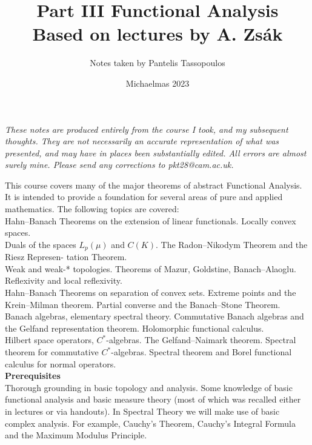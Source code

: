 \documentclass{article}
\title{\Huge Part III Functional Analysis \\ 
\huge Based on lectures by A. Zs\'{ak}}
\author{\Large Notes taken by Pantelis Tassopoulos}
\date{\Large Michaelmas 2023}
\begin{document}
\maketitle

\begin{center}
\textit{These notes are produced entirely from the course I took, and my subsequent thoughts. They are not necessarily an accurate representation of what was presented, and may have in places been substantially edited. All errors are almost surely mine. Please send any corrections to pkt28@cam.ac.uk.}

\end{center}

\noindent This course covers many of the major theorems of abstract Functional Analysis. It is intended to provide a foundation for several areas of pure and applied mathematics. The following topics are covered:\\

\noindent Hahn–Banach Theorems on the extension of linear functionals. Locally convex spaces.\\

\noindent Duals of the spaces $L_p(\mu)$ and $C(K)$. The Radon–Nikodym Theorem and the Riesz Represen-
tation Theorem.\\

\noindent Weak and weak-* topologies. Theorems of Mazur, Goldstine, Banach–Alaoglu. Reflexivity and
local reflexivity.\\

\noindent Hahn–Banach Theorems on separation of convex sets. Extreme points and the Krein–Milman
theorem. Partial converse and the Banach–Stone Theorem.\\

\noindent Banach algebras, elementary spectral theory. Commutative Banach algebras and the Gelfand
representation theorem. Holomorphic functional calculus.\\

\noindent Hilbert space operators, $C^*$-algebras. The Gelfand–Naimark theorem. Spectral theorem for
commutative $C^*$-algebras. Spectral theorem and Borel functional calculus for normal operators.\\

\noindent \textbf{Prerequisites}\\

\noindent Thorough grounding in basic topology and analysis. Some knowledge of basic functional analysis
and basic measure theory (most of which was recalled either in lectures or via handouts). In Spectral Theory we will make use of basic complex analysis. For example, Cauchy’s Theorem,
Cauchy’s Integral Formula and the Maximum Modulus Principle.\\
\end{document}
